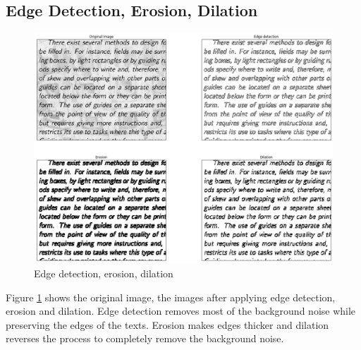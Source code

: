 \documentclass[10pt,twocolumn,letterpaper]{article}
\begin{document}
\subsection{Edge Detection, Erosion, Dilation}
\begin{figure}[h!]
    \centering
    \includegraphics[width=\columnwidth]{images/edde.png}
    \caption{Edge detection, erosion, dilation}
    \label{fig:edde}
\end{figure}
Figure \ref{fig:edde} shows the original image, the images after applying edge detection, erosion and dilation. Edge detection removes most of the background noise while preserving the edges of the texts. Erosion makes edges thicker and dilation reverses the process to completely remove the background noise.
\end{document}

